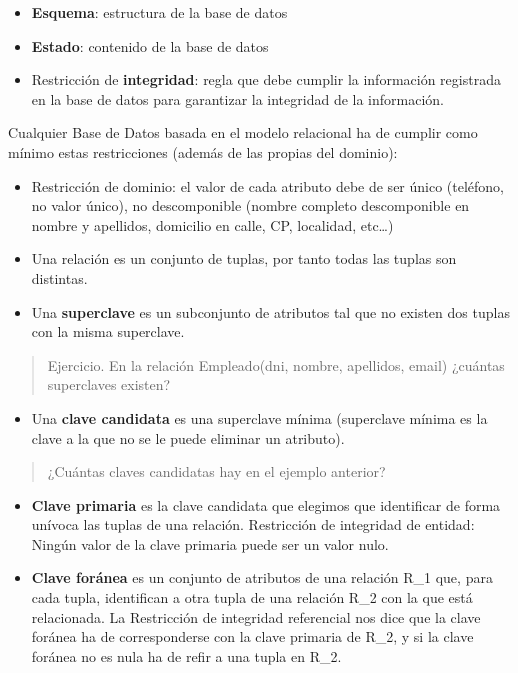 \documentclass[]{book}
\providecommand{\tightlist}{%
  \setlength{\itemsep}{0pt}\setlength{\parskip}{0pt}}
\begin{document}
\begin{itemize}
\item
  \textbf{Esquema}: estructura de la base de datos
\item
  \textbf{Estado}: contenido de la base de datos
\item
  Restricción de \textbf{integridad}: regla que debe cumplir la información registrada en la base de datos para garantizar la integridad de la información.
\end{itemize}

Cualquier Base de Datos basada en el modelo relacional ha de cumplir como mínimo estas restricciones (además de las propias del dominio):

\begin{itemize}
\item
  Restricción de dominio: el valor de cada atributo debe de ser único (teléfono, no valor único), no descomponible (nombre completo descomponible en nombre y apellidos, domicilio en calle, CP, localidad, etc\ldots{})
\item
  Una relación es un conjunto de tuplas, por tanto todas las tuplas son distintas.
\item
  Una \textbf{superclave} es un subconjunto de atributos tal que no existen dos tuplas con la misma superclave.
\end{itemize}

\begin{quote}
Ejercicio. En la relación Empleado(dni, nombre, apellidos, email) ¿cuántas superclaves existen?
\end{quote}

\begin{itemize}
\tightlist
\item
  Una \textbf{clave candidata} es una superclave mínima (superclave mínima es la clave a la que no se le puede eliminar un atributo).
\end{itemize}

\begin{quote}
¿Cuántas claves candidatas hay en el ejemplo anterior?
\end{quote}

\begin{itemize}
\item
  \textbf{Clave primaria} es la clave candidata que elegimos que identificar de forma unívoca las tuplas de una relación. Restricción de integridad de entidad: Ningún valor de la clave primaria puede ser un valor nulo.
\item
  \textbf{Clave foránea} es un conjunto de atributos de una relación R\_1 que, para cada tupla, identifican a otra tupla de una relación R\_2 con la que está relacionada.
  La Restricción de integridad referencial nos dice que la clave foránea ha de corresponderse con la clave primaria de R\_2, y si la clave foránea no es nula ha de refir a una tupla en R\_2.
\end{itemize}
\end{document}
